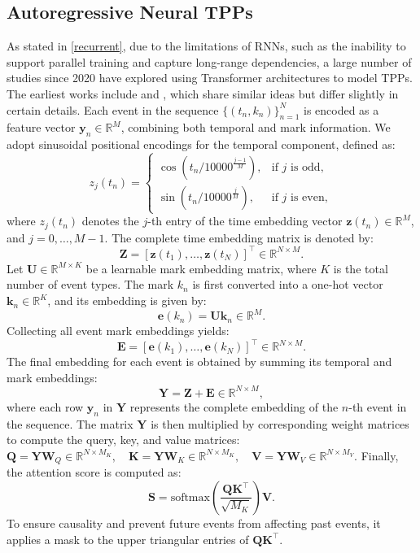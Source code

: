 \documentclass[10pt]{article} %
\begin{document}
\subsection{Autoregressive Neural TPPs}
\label{autoregressive}

As stated in \cref{recurrent}, due to the limitations of RNNs, such as the inability to support parallel training and capture long-range dependencies, a large number of studies since 2020 have explored using Transformer architectures to model TPPs. 
The earliest works include \citet{simiao2020transformer} and \citet{zhang2020self}, which share similar ideas but differ slightly in certain details. 
Each event in the sequence \(\{(t_n, k_n)\}_{n=1}^N\) is encoded as a feature vector \(\mathbf{y}_n \in \mathbb{R}^M\), combining both temporal and mark information.
We adopt sinusoidal positional encodings for the temporal component, defined as:
\[
z_j(t_n) =
\begin{cases}
\cos\left(t_n / 10000^{\frac{j-1}{M}} \right), & \text{if } j \text{ is odd},\\
\sin\left(t_n / 10000^{\frac{j}{M}} \right), & \text{if } j \text{ is even},
\end{cases}
\]
where \(z_j(t_n)\) denotes the \(j\)-th entry of the time embedding vector \(\mathbf{z}(t_n) \in \mathbb{R}^M\), and \(j = 0, \ldots, M-1\). The complete time embedding matrix is denoted by:
\[
\mathbf{Z} = [\mathbf{z}(t_1), \ldots, \mathbf{z}(t_N)]^\top \in \mathbb{R}^{N \times M}.
\]
Let \(\mathbf{U} \in \mathbb{R}^{M \times K}\) be a learnable mark embedding matrix, where \(K\) is the total number of event types. The mark \(k_n\) is first converted into a one-hot vector \(\mathbf{k}_n \in \mathbb{R}^K\), and its embedding is given by:
\[
\mathbf{e}(k_n) = \mathbf{U} \mathbf{k}_n \in \mathbb{R}^M.
\]
Collecting all event mark embeddings yields:
\[
\mathbf{E} = [\mathbf{e}(k_1), \ldots, \mathbf{e}(k_N)]^\top \in \mathbb{R}^{N \times M}.
\]
The final embedding for each event is obtained by summing its temporal and mark embeddings:
\[
\mathbf{Y} = \mathbf{Z} + \mathbf{E} \in \mathbb{R}^{N \times M},
\]
where each row \(\mathbf{y}_n\) in \(\mathbf{Y}\) represents the complete embedding of the \(n\)-th event in the sequence. 
The matrix $\mathbf{Y}$ is then multiplied by corresponding weight matrices to compute the query, key, and value matrices: 
$
\mathbf{Q} = \mathbf{Y}\mathbf{W}_Q\in\mathbb{R}^{N\times M_K}, \quad \mathbf{K} = \mathbf{Y}\mathbf{W}_K\in\mathbb{R}^{N\times M_K}, \quad \mathbf{V} = \mathbf{Y}\mathbf{W}_V\in\mathbb{R}^{N\times M_V}. 
$
Finally, the attention score is computed as: 
\begin{equation}
    \mathbf{S}=\text{softmax}\left(\frac{\mathbf{Q}\mathbf{K}^\top}{\sqrt{M_K}}\right)\mathbf{V}. 
    \label{attention}
\end{equation}
To ensure causality and prevent future events from affecting past events, it applies a mask to the upper triangular entries of \(\mathbf{Q}\mathbf{K}^\top\). 
\end{document}
